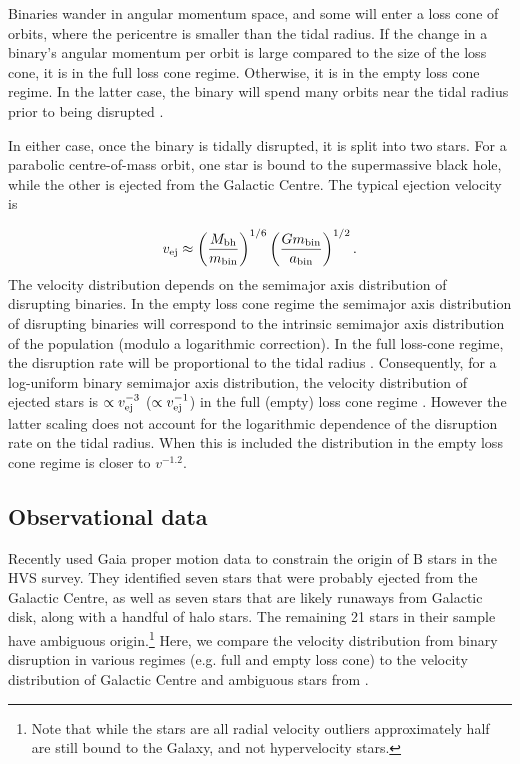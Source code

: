\documentclass[fleqn,usenatbib]{mnras}
\begin{document}
Binaries wander in angular momentum space, and some will enter a loss cone of orbits, where the pericentre is smaller than the tidal radius. If the change in a binary's angular momentum per orbit is large compared to the size of the loss cone, it is in the full loss cone regime. Otherwise, it is in the empty loss cone regime. In the latter case, the binary will spend many orbits near the tidal radius prior to being disrupted \citep{merritt2010}. 

In either case, once the binary is tidally disrupted, it is split into two stars. For a parabolic centre-of-mass orbit, one star is bound to the supermassive black hole, while the other is ejected from the Galactic Centre. The typical ejection velocity is 

\begin{equation}
    v_{\rm ej}\approx \left(\frac{M_{\rm bh}}{m_{\rm bin}} \right)^{1/6} \left(\frac{G m_{\rm bin}}{a_{\rm bin}}\right)^{1/2}.
    \label{eq:vej}
\end{equation}
The velocity distribution depends on the semimajor axis distribution of disrupting binaries.
In the empty loss cone regime the semimajor axis distribution of disrupting binaries will correspond to the intrinsic semimajor axis distribution of the population (modulo a logarithmic correction). In the full loss-cone regime, the disruption rate will be proportional to the tidal radius \citep{perets&gualandris2010}. Consequently, for a log-uniform binary semimajor axis distribution,
the velocity distribution of ejected stars is $\propto v_{\rm ej}^{-3}$ ($\propto v_{\rm ej}^{-1}$) in the full (empty) loss cone regime  \citep{rossi+2014}. However the latter scaling does not account for the logarithmic dependence of the disruption rate on the tidal radius. When this is included the distribution in the empty loss cone regime is closer to $v^{-1.2}$.

\subsection{Observational data}
Recently \citet{warren_brown+2018} used Gaia proper motion data to constrain the origin of B stars in the HVS survey. They identified seven stars that were probably ejected from the Galactic Centre, as well as seven stars that are likely runaways from Galactic disk, along with a handful of halo stars. The remaining 21 stars in their sample have ambiguous origin.\footnote{Note that while the \citet{warren_brown+2018} stars are all radial velocity outliers approximately half are still bound to the Galaxy, and not hypervelocity stars.} Here, we compare the velocity distribution from binary disruption in various regimes (e.g. full and empty loss cone) to the velocity distribution of Galactic Centre and ambiguous stars from \citet{warren_brown+2018}.  
\end{document}
